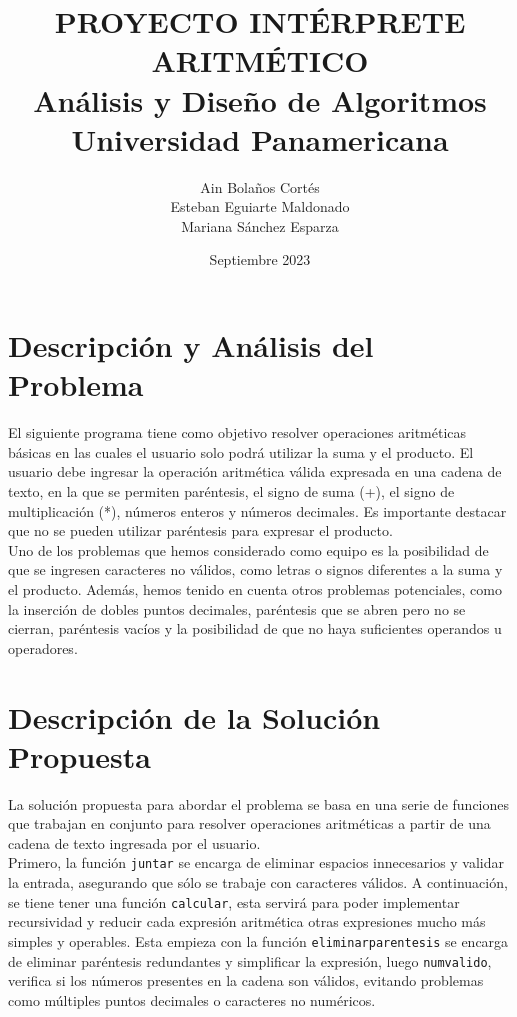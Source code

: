 \documentclass{article}
\title{PROYECTO INTÉRPRETE ARITMÉTICO \\ Análisis y Diseño de Algoritmos \\ Universidad Panamericana}
\author{Ain Bolaños Cortés\\Esteban Eguiarte Maldonado\\Mariana Sánchez Esparza}
\date{Septiembre 2023}
\begin{document}
\maketitle

\section{Descripción y Análisis del Problema}
El siguiente programa tiene como objetivo resolver operaciones aritméticas básicas en las cuales el usuario solo podrá utilizar la suma y el producto. El usuario debe ingresar la operación aritmética válida expresada en una cadena de texto, en la que se permiten paréntesis, el signo de suma (+), el signo de multiplicación (*), números enteros y números decimales. Es importante destacar que no se pueden utilizar paréntesis para expresar el producto.\\

Uno de los problemas que hemos considerado como equipo es la posibilidad de que se ingresen caracteres no válidos, como letras o signos diferentes a la suma y el producto. Además, hemos tenido en cuenta otros problemas potenciales, como la inserción de dobles puntos decimales, paréntesis que se abren pero no se cierran, paréntesis vacíos y la posibilidad de que no haya suficientes operandos u operadores.\\


\section{Descripción de la Solución Propuesta}
La solución propuesta para abordar el problema se basa en una serie de funciones que trabajan en conjunto para resolver operaciones aritméticas a partir de una cadena de texto ingresada por el usuario.\\

Primero, la función \texttt{juntar} se encarga de eliminar espacios innecesarios y validar la entrada, asegurando que sólo se trabaje con caracteres válidos. A continuación, se tiene tener una función \texttt{calcular}, esta servirá para poder implementar recursividad y reducir cada expresión aritmética otras expresiones mucho más simples y operables. Esta empieza con la función \texttt{eliminar\textunderscore parentesis} se encarga de eliminar paréntesis redundantes y simplificar la expresión, luego \texttt{num\textunderscore valido}, verifica si los números presentes en la cadena son válidos, evitando problemas como múltiples puntos decimales o caracteres no numéricos. \\
\end{document}
